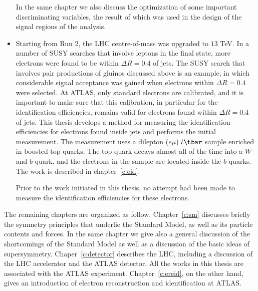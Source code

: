 \begin{itemize}[label=]
	      In the same chapter we also discuss the optimization of some important
	      discriminating variables, the result of which was used in the design of the
	      signal regions of the analysis.

	\item Starting from Run 2, the LHC centre-of-mass was upgraded to $13$ TeV. In
	      a number of SUSY searches that involve leptons in the final state, more
	      electrons were found to be within $\Delta R = 0.4$ of jets. The SUSY search
	      that involves pair productions of gluinos discussed above is an example, in
	      which considerable signal acceptance was gained when electrons within $\Delta R
		      = 0.4$ were selected. At ATLAS, only standard electrons are calibrated, and it
	      is important to make sure that this calibration, in particular for the
	      identification efficiencies, remains valid for electrons found within $\Delta R
		      = 0.4$ of jets. This thesis develops a method for measuring the identification
	      efficiencies for electrons found inside jets and performs the initial
	      measurement. The measurement uses a dilepton ($e\mu$) $t\tbar$ sample enriched
	      in boosted top quarks. The top quark decays almost all of the time into a $W$
	      and $b$-quark, and the electrons in the sample are located inside the
	      $b$-quarks. The work is described in chapter~\ref{c:eid}.

	      Prior to the work initiated in this thesis, no attempt had been made to measure
	      the identification efficiencies for these electrons.

\end{itemize}


The remaining chapters are organized as follow. Chapter~\ref{c:sm} discusses
briefly the symmetry principles that underlie the Standard Model, as well as
its particle contents and forces. In the same chapter we give also a general
discussion of the shortcomings of the Standard Model as well as a discussion of
the basic ideas of supersymmetry. Chaper~\ref{c:detector} describes the LHC,
including a discussion of the LHC accelerator and the ATLAS detector. All the
works in this thesis are associated with the ATLAS experiment.
Chapter~\ref{c:ereid}, on the other hand, gives an introduction of electron
reconstruction and identification at ATLAS.

